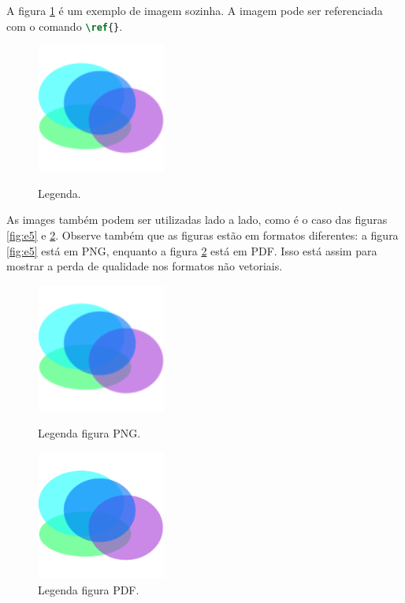     A figura \ref{fig:e4} é um exemplo de imagem sozinha.
    A imagem pode ser referenciada com o comando \lstinline[language=TeX, style=Code]|\ref{}|.


    \begin{figure}[htb]
        \centering
        \includegraphics[width=120pt]{images/figure.png}
        \caption{Legenda.}
        \label{fig:e4}
    \end{figure}

    As images também podem ser utilizadas lado a lado, como é o caso das figuras \ref{fig:e5} e \ref{fig:e6}.
    Observe também que as figuras estão em formatos diferentes: a figura \ref{fig:e5} está em PNG, enquanto a figura \ref{fig:e6} está em PDF.
    Isso está assim para mostrar a perda de qualidade nos formatos não vetoriais.


    \begin{figure}[htb]
        \centering
        \begin{minipage}{7.5cm}
            \centering
            \includegraphics[width=120pt]{images/figure.png}
            \caption{Legenda figura PNG.}
            \label{fig:e5}
        \end{minipage}
        \hfill
        \begin{minipage}{7.5cm}
            \centering
            \includegraphics[width=120pt]{images/figure.pdf}
            \caption{Legenda figura PDF.}
            \label{fig:e6}
        \end{minipage}
    \end{figure}

